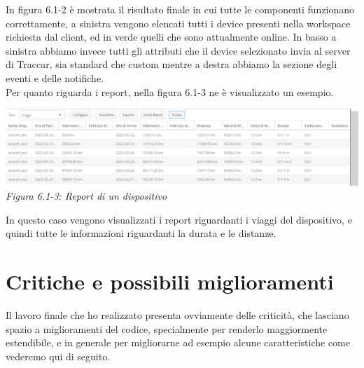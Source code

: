 \documentclass[a4paper,titlepage,12pt]{report}
\begin{document}
{In figura 6.1-2 è mostrata il risultato finale in cui tutte le componenti funzionano correttamente, a sinistra vengono elencati tutti i device presenti nella workspace richiesta dal client, ed in verde quelli che sono attualmente online. In basso a sinistra abbiamo invece tutti gli attributi che il device selezionato invia al server di Traccar, sia standard che custom mentre a destra abbiamo la sezione degli eventi e delle notifiche.\\
Per quanto riguarda i report, nella figura 6.1-3 ne è visualizzato un esempio.

\begin{center}
\includegraphics[scale=0.3]{images/reports.png}\\ 
\textit{Figura 6.1-3: Report di un dispositivo}
\end{center}

In questo caso vengono visualizzati i report riguardanti i viaggi del dispositivo, e quindi tutte le informazioni riguardanti la durata e le distanze.\\


\section{
Critiche e possibili miglioramenti}
Il lavoro finale che ho realizzato presenta ovviamente delle criticità, che lasciano spazio a miglioramenti del codice, specialmente per renderlo maggiormente estendibile, e in generale per migliorarne ad esempio alcune caratteristiche come vederemo qui di seguito.\\

}
\end{document}
